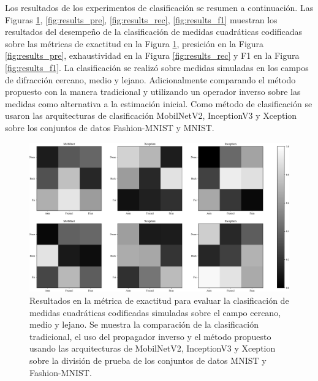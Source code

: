 Los resultados de los experimentos de clasificación se resumen a continuación. Las Figuras \ref{fig:results_acc}, \ref{fig:results_pre},  \ref{fig:results_rec}, \ref{fig:results_f1} muestran los resultados del desempeño de la clasificación de medidas cuadráticas codificadas sobre las métricas de exactitud en la Figura \ref{fig:results_acc}, presición en la Figura \ref{fig:results_pre}, exhaustividad  en la Figura \ref{fig:results_rec} y F1 en la Figura \ref{fig:results_f1}. La clasificación se realizó sobre medidas simuladas en los campos de difracción cercano, medio y lejano. Adicionalmente comparando el método propuesto con la manera tradicional y utilizando un operador inverso sobre las medidas como alternativa a la estimación inicial. Como método de clasificación se usaron las arquitecturas de clasificación MobilNetV2, InceptionV3 y Xception sobre los conjuntos de datos Fashion-MNIST y MNIST.


\begin{figure}[!h]
    \centering
    \includegraphics[width=\linewidth]{images/test_result_acc.pdf}
    \caption{Resultados en la métrica de exactitud para evaluar la clasificación de medidas cuadráticas codificadas simuladas sobre el campo cercano, medio y lejano. Se muestra la comparación de la clasificación tradicional, el uso del propagador inverso y el método propuesto usando las arquitecturas de MobilNetV2, InceptionV3 y Xception sobre la división de prueba de los conjuntos de datos MNIST y Fashion-MNIST.}
    \label{fig:results_acc}
\end{figure}

